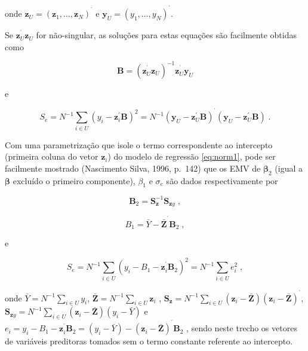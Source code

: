 \documentclass[]{book}
\begin{document}
onde
\(\mathbf{z}_{U}=\left( \mathbf{z}_{1},\ldots ,\mathbf{z}_{N}\right) ^{^{\prime }}\)
e \(\mathbf{y}_{U}=\left( y_{1},\ldots ,y_{N}\right) ^{^{\prime }}\).

Se \(\mathbf{z}_{U}^{^{\prime }}\mathbf{z}_{U}\) for não-singular, as
soluções para estas equações são facilmente obtidas como

\begin{equation}
\mathbf{B}=\left( \mathbf{z}_{U}^{^{\prime }}\mathbf{z}_{U}\right) ^{-1}
\mathbf{z}_{U}^{^{\prime }}\mathbf{y}_{U}  
\label{eq:norm6}
\end{equation}

e

\begin{equation}
S_{e}=N^{-1}\sum\limits_{i\in U}\left( y_{i}-\mathbf{z}_{i}^{\prime }\mathbf{
B}\right) ^{2}=N^{-1}\left( \mathbf{y}_{U}-\mathbf{z}_{U}^{\prime }\mathbf{B}
\right) ^{^{\prime }}\left( \mathbf{y}_{U}-\mathbf{z}_{U}^{\prime }\mathbf{B}
\right) \;.  
\label{eq:norm7}
\end{equation}

Com uma parametrização que isole o termo correspondente ao intercepto
(primeira coluna do vetor \(\mathbf{z}_{i}\)) do modelo de regressão
\eqref{eq:norm1}, pode ser facilmente mostrado (Nascimento Silva, 1996,
p.~142) que os EMV de \(\mathbf{\beta }_{2}\) (igual a
\(\mathbf{\beta }\) excluído o primeiro componente), \(\beta _{1}\) e
\(\sigma _{e}\) são dados respectivamente por

\begin{equation}
\mathbf{B}_{2}=\mathbf{S}_{\mathbf{z}}^{-1}\mathbf{S}_{\mathbf{z}y}\;,
\label{eq:norm8}
\end{equation}

\begin{equation}
B_{1}=\bar{Y}-\mathbf{\bar{Z}}^{^{\prime }}\mathbf{B}_{2}\mathbf{\;,}
\label{eq:norm9}
\end{equation}

e

\begin{equation}
S_{e}=N^{-1}\sum\limits_{i\in U}\left( y_{i}-B_{1}-\mathbf{z}_{i}^{^{\prime
}}\mathbf{B}_{2}\right) ^{2}=N^{-1}\sum\limits_{i\in U}e_{i}^{2}\;,
\label{eq:norm10}
\end{equation}

onde \(\bar{Y}=N^{-1}\sum\limits_{i\in U}y_{i}\),
\(\mathbf{\bar{Z}}=N^{-1}\sum\limits_{i\in U}\mathbf{z}_{i}\) ,
\(\mathbf{S}_{\mathbf{z}}=N^{-1}\sum\limits_{i\in U}\left( \mathbf{z}_{i}-\mathbf{\bar{Z}}\right)\left( \mathbf{z}_{i}-\mathbf{\bar{Z}}\right) ^{^{\prime }}\),
\(\mathbf{S}_{ \mathbf{z}y}=N^{-1}\sum\limits_{i\in U}\left( \mathbf{z}_{i}-\mathbf{\bar{Z}}\right) \left( y_{i}-\bar{Y}\right)\)
e
\(e_{i}=y_{i}-B_{1}-\mathbf{z}_{i}^{^{\prime }}\mathbf{B}_{2}=\left( y_{i}-\bar{Y}\right) -\left( \mathbf{z}_{i}-\mathbf{\bar{Z}}\right) ^{^{\prime }}\mathbf{B}_{2}\)
, sendo neste trecho os vetores de variáveis preditoras tomados sem o
termo constante referente ao intercepto.
\end{document}
